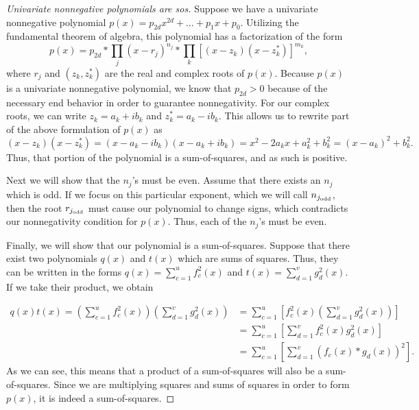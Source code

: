 	\begin{proof} [Univariate nonnegative polynomials are sos]
		Suppose we have a univariate nonnegative polynomial $p(x) = p_{2d} x^{2d} + \dots + p_{1} x + p_{0}$. Utilizing the fundamental theorem of algebra, this polynomial has a factorization of the form
		$$
		p(x) = p_{2d} * \prod_{j} (x - r_j)^{n_j} * \prod_{k} [(x - z_k)(x-z_k^*)]^{m_k},
		$$
		where $r_j$ and $(z_k, z_k^*)$ are the real and complex roots of $p(x)$. Because $p(x)$ is a univariate nonnegative polynomial, we know that $p_{2d} > 0$ because of the necessary end behavior in order to guarantee nonnegativity. For our complex roots, we can write $z_k = a_k + ib_k$ and $z_k^* = a_k - ib_k$. This allows us to rewrite part of the above formulation of $p(x)$ as 
		$$
		(x - z_k)(x -z_k^*) = (x - a_k - ib_k)(x - a_k + ib_k) = x^2 - 2a_k x + a_k^2 + b_k^2 = (x - a_k)^2 + b_k^2.
		$$
		Thus, that portion of the polynomial is a sum-of-squares, and as such is positive. 
		
		Next we will show that the $n_j$'s must be even. Assume that there exists an $n_j$ which is odd. If we focus on this particular exponent, which we will call $n_{j_{\textnormal{odd}}}$, then the root $r_{j_{\textnormal{odd}}}$ must cause our polynomial to change signs, which contradicts our nonnegativity condition for $p(x)$. Thus, each of the $n_j$'s must be even.
		
		Finally, we will show that our polynomial is a sum-of-squares. Suppose that there exist two polynomials $q(x)$ and $t(x)$ which are sums of squares. Thus, they can be written in the forms $q(x) = \sum_{c=1}^{u} f_{c}^2 (x)$ and $t(x) = \sum_{d=1}^{v} g_{d}^2 (x)$. If we take their product, we obtain 
		
		$$\begin{aligned}
		q(x)t(x) = \left(\sum_{c=1}^{u} f_{c}^2 (x)\right)\left(\sum_{d=1}^{v} g_{d}^2 (x)\right) &= \sum_{c=1}^{u} \left[f_{c}^2 (x)\left(\sum_{d=1}^{v} g_{d}^2 (x)\right)\right]\\
		&= \sum_{c=1}^{u} \left[\sum_{d=1}^{v} f_{c}^2 (x)g_{d}^2 (x)\right]\\
		&= \sum_{c=1}^{u} \left[\sum_{d=1}^{v} \left(f_{c}(x) *g_{d} (x)\right)^2\right].
		\end{aligned}$$
		As we can see, this means that a product of a sum-of-squares will also be a sum-of-squares. Since we are multiplying squares and sums of squares in order to form $p(x)$, it is indeed a sum-of-squares. 
	\end{proof}
	
